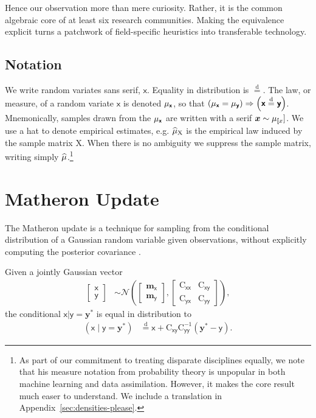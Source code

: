 \documentclass[wcp]{jmlr} %
\newcommand{\vv}[1]{\boldsymbol{#1}}
\newcommand{\mm}[1]{\mathrm{#1}}
\newcommand{\rv}[1]{\mathsf{#1}}
\newcommand{\vrv}[1]{\vv{\rv{#1}}}
\newcommand{\disteq}{\stackrel{\mathrm{d}}{=}}
\newcommand{\Normal}{\mathcal{N}}
\newcommand{\gvn}{\mid}
\begin{document}
Hence our observation more than mere curiosity.
Rather, it is the common algebraic core of at least six research communities.
Making the equivalence explicit turns a patchwork of field-specific heuristics into transferable technology.

\subsection{Notation}

We write random variates sans serif, $\vrv{x}$.
Equality in distribution is $\disteq$.
The law, or measure, of a random variate $\vrv{x}$ is denoted $\Law[\vrv{x}]$,
so that $\left(\Law[\vrv{x}]=\Law[\vrv{y}]\right) \Rightarrow \left(\vrv{x}\disteq\vrv{y}\right)$.
Mnemonically, samples drawn from the $\Law[\vrv{x}]$ are written with a serif $\vv{x}\sim\Law[\vrv[x]]$.
We use a hat to denote empirical estimates, e.g. \(\ELaw[\mm{X}]\) is the empirical law induced by the sample matrix \(\mm{X}\).
When there is no ambiguity we suppress the sample matrix, writing simply \(\widehat{\Law}\).\footnote{As part of our commitment to treating disparate disciplines equally, we note that his measure notation from probability theory is unpopular in both machine learning and data assimilation. However, it makes the core result much easer to understand.
We include a translation in Appendix~\ref{sec:densities-please}.}

\section{Matheron Update}

The Matheron update is a technique for sampling from the conditional distribution of a Gaussian random variable given observations, without explicitly computing the posterior covariance \citep{Doucet2010Note,Wilson2020Efficiently,Wilson2021Pathwise}.

\begin{lemma}
Given a jointly Gaussian vector
\begin{align}
    \begin{bmatrix} \vrv{x} \\ \vrv{y} \end{bmatrix}
    &\sim \Normal\left(\begin{bmatrix} \vv{m}_{\vrv{x}} \\ \vv{m}_{\vrv{y}} \end{bmatrix}, \begin{bmatrix} \mm{C}_{\vrv{xx}} & \mm{C}_{\vrv{xy}} \\ \mm{C}_{\vrv{yx}} & \mm{C}_{\vrv{yy}} \end{bmatrix}\right), \label{eq:joint-gaussian}
\end{align}
the conditional $\vrv{x} | \vrv{y} {=} \vv{y}^*$ is equal in distribution to
\begin{align}
    \left(\vrv{x} \gvn \vrv{y} {=} \vv{y}^*\right)
    &\disteq \vrv{x} + \mm{C}_{\vrv{xy}} \mm{C}_{\vrv{yy}}^{-1} \left( \vv{y}^* - \vrv{y} \right).
    \label{eq:matheron-update}
\end{align}
\end{lemma}
\end{document}
